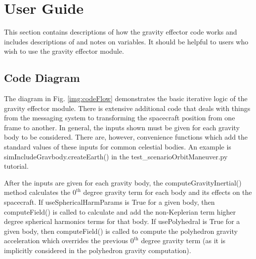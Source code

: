\section{User Guide}
This section contains descriptions of how the gravity effector code works and includes descriptions of and notes on variables. It should be helpful to users who wish to use the gravity effector module.

\subsection{Code Diagram}
The diagram in Fig. \ref{img:codeFlow} demonstrates the basic iterative logic of the gravity effector module. There is extensive additional code that deals with things from the messaging system to transforming the spacecraft position from one frame to another. In general, the inputs shown must be given for each gravity body to be considered. There are, however, convenience functions which add the standard values of these inputs for common celestial bodies. An example is simIncludeGravbody.createEarth() in the test\_scenarioOrbitManeuver.py tutorial.

After the inputs are given for each gravity body, the computeGravityInertial() method calculates the $0^{\textrm{th}}$ degree gravity term for each body and its effects on the spacecraft. If useSphericalHarmParams is True for a given body, then computeField() is called to calculate and add the non-Keplerian term higher degree spherical harmonics terms for that body. If usePolyhedral is True for a given body, then computeField() is called to compute the polyhedron gravity acceleration which overrides the previous $0^{\textrm{th}}$ degree gravity term (as it is implicitly considered in the polyhedron gravity computation). 

